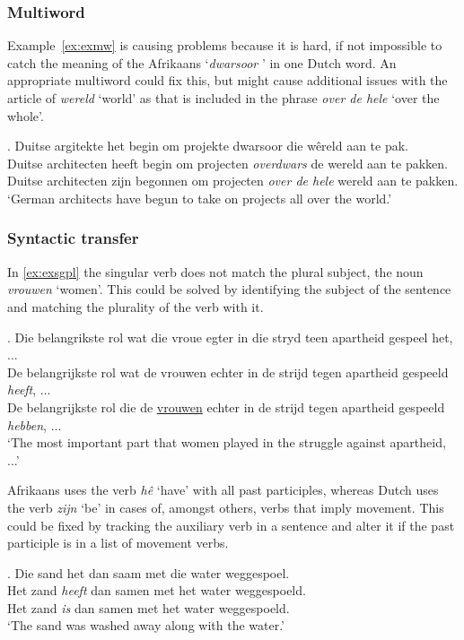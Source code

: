 \documentclass[11pt]{article}
\begin{document}
\subsubsection{Multiword}

Example~\ref{ex:exmw} is causing problems because it is hard, if not impossible to catch the meaning of the 
Afrikaans `{\em dwarsoor}  ' in one Dutch word. An appropriate multiword could fix this, but might 
cause additional issues with the article of {\em wereld} `world' as that is included in the 
phrase {\em over de hele} `over the whole'.

\ex. \label{ex:exmw} 
    Duitse argitekte het begin om projekte dwarsoor die wêreld aan te pak. \\
    Duitse architecten heeft begin om projecten {\em overdwars} de wereld aan te pakken. \\
    Duitse architecten zijn begonnen om projecten {\em over de hele} wereld aan te pakken. \\
   `German architects have begun to take on projects all over the world.'

\subsubsection{Syntactic transfer}

In \ref{ex:exsgpl} the singular verb does not match the plural subject, the noun {\em vrouwen} `women'. This 
could be solved by identifying the subject of the sentence and matching the plurality 
of the verb with it.

\ex. \label{ex:exsgpl} 
    Die belangrikste rol wat die vroue egter in die stryd teen apartheid gespeel het, ... \\
    De belangrijkste rol wat de vrouwen echter in de strijd tegen apartheid gespeeld {\em heeft}, ... \\
    De belangrijkste rol die de \underline{vrouwen} echter in de strijd tegen apartheid gespeeld {\em hebben}, ... \\
    `The most important part that women played in the struggle against apartheid, ...' 

Afrikaans uses the verb {\em hê} `have' with all past participles, whereas Dutch uses the 
verb {\em zijn} `be' in cases of, amongst others, verbs that imply movement. This could be fixed 
by tracking the auxiliary verb in a sentence and alter it if the past participle is in a list
of movement verbs.

\ex. \label{ex:exserhaverl} 
    Die sand het dan saam met die water weggespoel. \\
    Het zand {\em heeft} dan samen met het water weggespoeld. \\
    Het zand {\em is} dan samen met het water weggespoeld. \\
   `The sand was washed away along with the water.'
\end{document}

